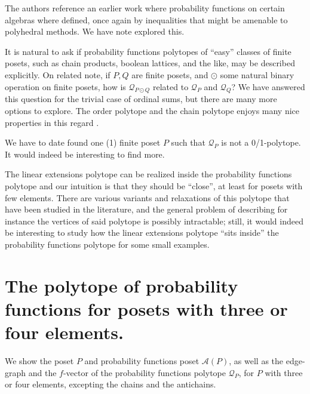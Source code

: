 \documentclass[11pt,a4paper,abstract=yes]{scrartcl}
\theoremstyle{plain}
\newcommand{\prpolytope}[1]{\mathcal{Q}_{#1}}
\newcommand{\twoanti}[1]{\mathcal{A}({#1})}
\begin{document}
The authors reference an earlier work \autocite{neggers2011trends} where probability functions
on certain algebras where defined, once again by inequalities that might be amenable to polyhedral methods.
We have note explored this.

It is natural to ask if probability functions polytopes of ``easy'' classes of finite posets, such as chain products,
boolean lattices, and the like, may be described explicitly. On related note,
if \(P,Q\) are finite posets, and \(\odot\) some natural binary operation on finite posets, how is
\(\prpolytope{P \odot Q}\) related to \(\prpolytope{P}\) and \(\prpolytope{Q}\)? We have answered this
question for the trivial case of ordinal sums, but there are many more options to explore.
The order polytope and the chain polytope enjoys many nice properties in this regard \autocite{Freij-Hollanti_Lundström_2024}.

We have to date found one (1) finite poset \(P\) such that \(\prpolytope{P}\) is not a 0/1-polytope.
It would indeed be interesting to find more.

The linear extensions polytope can be realized inside the probability functions polytope and our intuition is that they should
be ``close'', at least for posets with few elements. There are various variants and relaxations of this
polytope that have been studied in the literature, and the general problem of describing for instance
the vertices of said polytope is possibly intractable; still, it would indeed be interesting to
study how the linear extensions polytope ``sits inside'' the probability functions polytope for some small examples.
\section{The polytope of probability functions for posets with three or four elements.}
\label{sec:org862a568}
We show the poset \(P\) and  probability functions poset \(\twoanti{P}\), as well as the
edge-graph and the \(f\)-vector
of the probability functions polytope \(\prpolytope{P}\),
for \(P\) with three or four elements, excepting the chains and the antichains.
\end{document}
